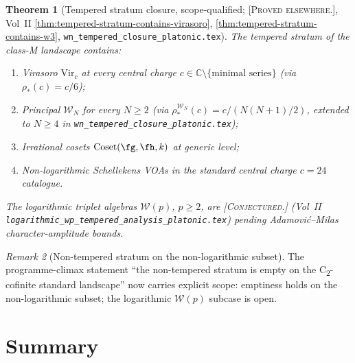 \documentclass[11pt]{amsart}
\newtheorem{theorem}{Theorem}[section]
\theoremstyle{definition}
\theoremstyle{remark}
\newtheorem{remark}[theorem]{Remark}
\providecommand{\cW}{\mathcal{W}}
\providecommand{\ClaimStatusProvedElsewhere}{\textsc{[Proved elsewhere.]}}
\providecommand{\ClaimStatusConjectured}{\textsc{[Conjectured.]}}
\begin{document}
\begin{theorem}[Tempered stratum closure, scope-qualified;
\ClaimStatusProvedElsewhere, Vol~II
\ref*{thm:tempered-stratum-contains-virasoro},
\ref*{thm:tempered-stratum-contains-w3},
\texttt{wn\_tempered\_closure\_platonic.tex}]%
\label{thm:tempered-closure-scope}%
The tempered stratum of the class-M landscape contains:
\begin{enumerate}[label=\textup{(\alph*)}]
\item Virasoro $\mathrm{Vir}_c$ at every central charge
  $c \in \mathbb{C} \setminus \{\text{minimal series}\}$
  (via $\rho_*(c) = c/6$);
\item Principal $\cW_N$ for every $N \ge 2$ (via
  $\rho_*^{\cW_N}(c) = c/(N(N+1)/2)$, extended to
  $N \ge 4$ in \texttt{wn\_tempered\_closure\_platonic.tex});
\item Irrational cosets \(\mathrm{Coset}(\fg, \fh, k)\) at generic
  level;
\item Non-logarithmic Schellekens VOAs in the standard central
  charge $c = 24$ catalogue.
\end{enumerate}
The logarithmic triplet algebras $\cW(p)$, $p \ge 2$, are
\ClaimStatusConjectured{} (Vol~II
\texttt{logarithmic\_wp\_tempered\_analysis\_platonic.tex}) pending
Adamovi\'c--Milas character-amplitude bounds.
\end{theorem}

\begin{remark}[Non-tempered stratum on the non-logarithmic subset]
\label{rem:non-tempered-empty}
The programme-climax statement ``the non-tempered stratum is empty
on the C\textsubscript{2}-cofinite standard landscape'' now carries
explicit scope: emptiness holds on the non-logarithmic subset; the
logarithmic $\cW(p)$ subcase is open.
\end{remark}

\section{Summary}
\label{sec:summary-classM}
\end{document}
